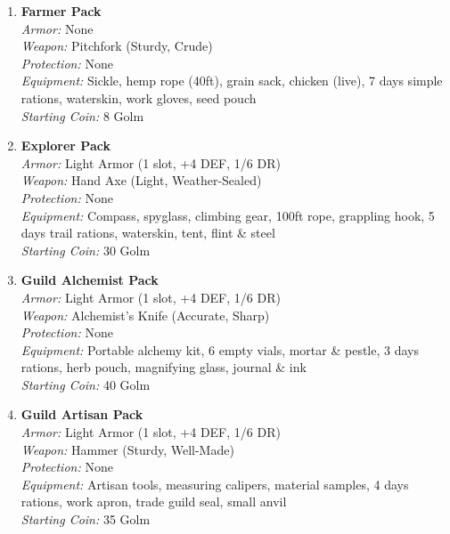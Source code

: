 \documentclass[10pt,twoside]{article}
\begin{document}
\begin{multicols}{2}
\begin{enumerate}
    \item \textcolor{packcolor}{\textbf{Farmer Pack}} \\
    \textit{Armor:} None \\
    \textit{Weapon:} Pitchfork (Sturdy, Crude) \\
    \textit{Protection:} None \\
    \textit{Equipment:} Sickle, hemp rope (40ft), grain sack, chicken (live), 7 days simple rations, waterskin, work gloves, seed pouch \\
    \textit{Starting Coin:} 8 Golm
    
    \item \textcolor{packcolor}{\textbf{Explorer Pack}} \\
    \textit{Armor:} Light Armor (1 slot, +4 DEF, 1/6 DR) \\
    \textit{Weapon:} Hand Axe (Light, Weather-Sealed) \\
    \textit{Protection:} None \\
    \textit{Equipment:} Compass, spyglass, climbing gear, 100ft rope, grappling hook, 5 days trail rations, waterskin, tent, flint \& steel \\
    \textit{Starting Coin:} 30 Golm
    
    \columnbreak
    
    \item \textcolor{packcolor}{\textbf{Guild Alchemist Pack}} \\
    \textit{Armor:} Light Armor (1 slot, +4 DEF, 1/6 DR) \\
    \textit{Weapon:} Alchemist's Knife (Accurate, Sharp) \\
    \textit{Protection:} None \\
    \textit{Equipment:} Portable alchemy kit, 6 empty vials, mortar \& pestle, 3 days rations, herb pouch, magnifying glass, journal \& ink \\
    \textit{Starting Coin:} 40 Golm
    
    \item \textcolor{packcolor}{\textbf{Guild Artisan Pack}} \\
    \textit{Armor:} Light Armor (1 slot, +4 DEF, 1/6 DR) \\
    \textit{Weapon:} Hammer (Sturdy, Well-Made) \\
    \textit{Protection:} None \\
    \textit{Equipment:} Artisan tools, measuring calipers, material samples, 4 days rations, work apron, trade guild seal, small anvil \\
    \textit{Starting Coin:} 35 Golm
    

\end{enumerate}
\end{multicols}
\end{document}
